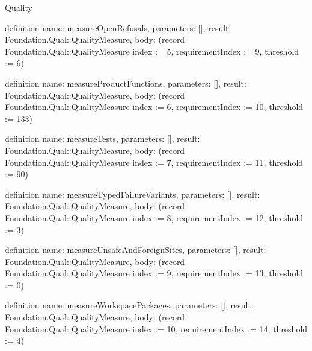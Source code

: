 \begin{lexlean}{Quality}
\begin{semanticmodule}
definition{
  name: measureOpenRefusals,
  parameters: [],
  result: Foundation.Qual::QualityMeasure,
  body: (record Foundation.Qual::QualityMeasure {index := 5, requirementIndex := 9, threshold := 6})
}

definition{
  name: measureProductFunctions,
  parameters: [],
  result: Foundation.Qual::QualityMeasure,
  body: (record Foundation.Qual::QualityMeasure {index := 6, requirementIndex := 10, threshold := 133})
}

definition{
  name: measureTests,
  parameters: [],
  result: Foundation.Qual::QualityMeasure,
  body: (record Foundation.Qual::QualityMeasure {index := 7, requirementIndex := 11, threshold := 90})
}

definition{
  name: measureTypedFailureVariants,
  parameters: [],
  result: Foundation.Qual::QualityMeasure,
  body: (record Foundation.Qual::QualityMeasure {index := 8, requirementIndex := 12, threshold := 3})
}

definition{
  name: measureUnsafeAndForeignSites,
  parameters: [],
  result: Foundation.Qual::QualityMeasure,
  body: (record Foundation.Qual::QualityMeasure {index := 9, requirementIndex := 13, threshold := 0})
}

definition{
  name: measureWorkspacePackages,
  parameters: [],
  result: Foundation.Qual::QualityMeasure,
  body: (record Foundation.Qual::QualityMeasure {index := 10, requirementIndex := 14, threshold := 4})
}
\end{semanticmodule}
\end{lexlean}
